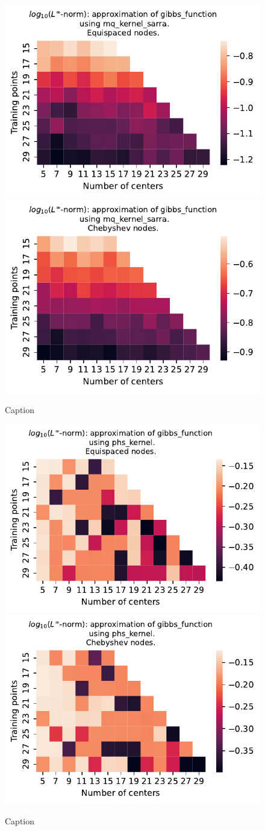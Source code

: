 \documentclass[12pt]{report} %
\begin{document}
\begin{figure}[ht]
    \centering
    
    \includegraphics[width=.49\textwidth]{imagenes/experiments/1d/variational/gibbs_function-Kmq_kernel_sarra-Equi.pdf}
    \includegraphics[width=.49\textwidth]{imagenes/experiments/1d/variational/gibbs_function-Kmq_kernel_sarra-Cheb.pdf}
    \caption{Caption}
    \label{fig:gibbs-sarra}
\end{figure}

\begin{figure}[ht]
    \centering
    
    \includegraphics[width=.49\textwidth]{imagenes/experiments/1d/variational/gibbs_function-Kphs_kernel-Equi.pdf}
    \includegraphics[width=.49\textwidth]{imagenes/experiments/1d/variational/gibbs_function-Kphs_kernel-Cheb.pdf}
    \caption{Caption}
    \label{fig:gibbs-phs}
\end{figure}
\end{document}

